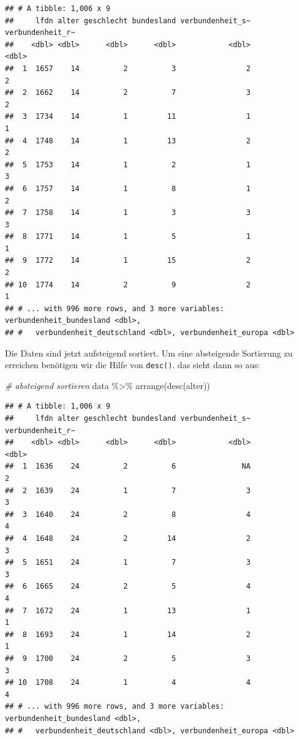 \documentclass[
]{book}
\newenvironment{Shaded}{\begin{snugshade}}{\end{snugshade}}
\newcommand{\CommentTok}[1]{\textcolor[rgb]{0.56,0.35,0.01}{\textit{#1}}}
\newcommand{\FunctionTok}[1]{\textcolor[rgb]{0.00,0.00,0.00}{#1}}
\newcommand{\NormalTok}[1]{#1}
\newcommand{\SpecialCharTok}[1]{\textcolor[rgb]{0.00,0.00,0.00}{#1}}
\begin{document}
\begin{verbatim}
## # A tibble: 1,006 x 9
##     lfdn alter geschlecht bundesland verbundenheit_s~ verbundenheit_r~
##    <dbl> <dbl>      <dbl>      <dbl>            <dbl>            <dbl>
##  1  1657    14          2          3                2                2
##  2  1662    14          2          7                3                2
##  3  1734    14          1         11                1                1
##  4  1748    14          1         13                2                2
##  5  1753    14          1          2                1                3
##  6  1757    14          1          8                1                2
##  7  1758    14          1          3                3                3
##  8  1771    14          1          5                1                1
##  9  1772    14          1         15                2                2
## 10  1774    14          2          9                2                1
## # ... with 996 more rows, and 3 more variables: verbundenheit_bundesland <dbl>,
## #   verbundenheit_deutschland <dbl>, verbundenheit_europa <dbl>
\end{verbatim}

Die Daten sind jetzt aufsteigend sortiert. Um eine absteigende Sortierung zu erreichen benötigen wir die Hilfe von \texttt{desc()}. das sieht dann so aus:

\begin{Shaded}
\begin{Highlighting}[]
\CommentTok{\# absteigend sortieren}
\NormalTok{data }\SpecialCharTok{\%\textgreater{}\%} 
  \FunctionTok{arrange}\NormalTok{(}\FunctionTok{desc}\NormalTok{(alter))}
\end{Highlighting}
\end{Shaded}

\begin{verbatim}
## # A tibble: 1,006 x 9
##     lfdn alter geschlecht bundesland verbundenheit_s~ verbundenheit_r~
##    <dbl> <dbl>      <dbl>      <dbl>            <dbl>            <dbl>
##  1  1636    24          2          6               NA                2
##  2  1639    24          1          7                3                3
##  3  1640    24          2          8                4                4
##  4  1648    24          2         14                2                3
##  5  1651    24          1          7                3                3
##  6  1665    24          2          5                4                4
##  7  1672    24          1         13                1                1
##  8  1693    24          1         14                2                1
##  9  1700    24          2          5                3                3
## 10  1708    24          1          4                4                4
## # ... with 996 more rows, and 3 more variables: verbundenheit_bundesland <dbl>,
## #   verbundenheit_deutschland <dbl>, verbundenheit_europa <dbl>
\end{verbatim}
\end{document}
